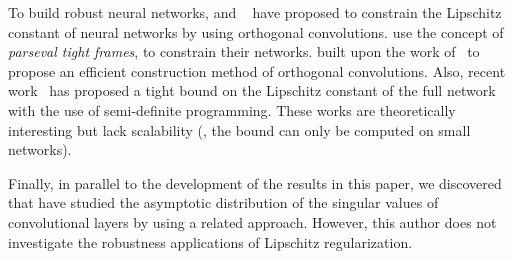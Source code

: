 {To build robust neural networks, \citet{cisse2017parseval} and ~\citet{li2019preventing} have proposed to constrain the Lipschitz constant of neural networks by using orthogonal convolutions.
\citet{cisse2017parseval} use the concept of \emph{parseval tight frames}, to constrain their networks.
\citet{li2019preventing} built upon the work of~\citet{cisse2017parseval} to propose an efficient construction method of orthogonal convolutions.  
Also, recent work~\cite{fazlyab2019efficient,latorre2020lipschitz} has proposed a tight bound on the Lipschitz constant of the full network with the use of semi-definite programming.
These works are theoretically interesting but lack scalability (\ie, the bound can only be computed on small networks).

Finally, in parallel to the development of the results in this paper, we discovered that \citet{yi2020asymptotic} have studied the asymptotic distribution of the singular values of convolutional layers by using a related approach. However, this author does not investigate the robustness applications of Lipschitz regularization.



}

